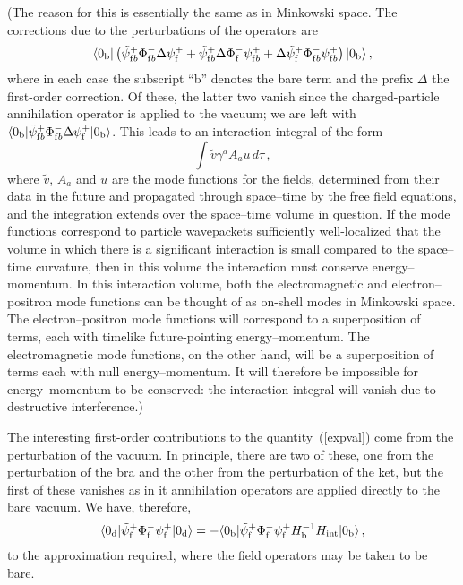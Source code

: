 \documentclass[11pt]{article}
\begin{document}
(The reason for this is essentially the same as in Minkowski space.
The corrections due to the perturbations of the operators are
\begin{equation}
\langle 0_{\rm b}| \left({\tilde\psi}^+_{{\rm f}b}\Phi
^-_{{\rm f}b}\Delta\psi ^+_{\rm f}+{\tilde\psi}^+_{{\rm f}b}\Delta\Phi
^-_{\rm f}\psi ^+_{{\rm f}b}+\Delta {\tilde\psi}^+_{\rm f}\Phi
^-_{{\rm f}b}\psi ^+_{{\rm f}b} \right) |0_{\rm b}\rangle\, ,
\end{equation}
where in each case the subscript ``b'' denotes the bare term and the
prefix $\Delta$ the first-order correction.  Of these, the latter two
vanish since the charged-particle annihilation operator is applied to
the vacuum; we are left with
$\langle 0_{\rm b}| {\tilde\psi}^+_{{\rm f}b}\Phi
^-_{{\rm f}b}\Delta\psi ^+_{\rm f}
|0_{\rm b}\rangle$.
This leads to an interaction integral of the form
\begin{equation}
  \int \tilde v \gamma ^aA_a u\, d\tau\, ,
\end{equation}
where $\tilde v$, $A_a$ and $u$ are the mode functions for the fields,
determined from their data in the future and propagated through
space--time by the free field equations,
and the integration extends over the space--time volume in question.
If the mode functions correspond to particle wavepackets sufficiently
well-localized that the volume in which there is a significant
interaction is small compared to the space--time curvature, then in
this volume the interaction must conserve energy--momentum. 
In this interaction volume, both the electromagnetic and
electron--positron mode functions can be thought of as on-shell modes
in Minkowski space.  The electron--positron mode functions will
correspond to a superposition of terms, each with timelike
future-pointing energy--momentum.  The electromagnetic mode functions,
on the other hand, will be a superposition of terms each with null
energy--momentum.  It will therefore be impossible for
energy--momentum to be conserved:  the interaction integral will
vanish due to destructive interference.)


The interesting first-order contributions to the quantity~(\ref{expval}) come
from the perturbation of the vacuum.  In principle, there are two of these, one
from the perturbation of the bra and the other from the perturbation of the
ket, but the first of these vanishes as in it annihilation operators are
applied directly to the bare vacuum.  We have, therefore, 
\begin{equation}
\langle 0_{\rm d}|{\tilde\psi}^+_{\rm f}\Phi
^-_{\rm f}\psi ^+_{\rm f}|0_{\rm d}\rangle =
-\langle 0_{\rm b}|{\tilde\psi}^+_{\rm f}\Phi
^-_{\rm f}\psi ^+_{\rm f}H_{\rm b}^{-1}H_{\rm int}|0_{\rm b}\rangle\,
,
\end{equation}
to the approximation required, where the field operators may be taken
to be bare.
\end{document}
